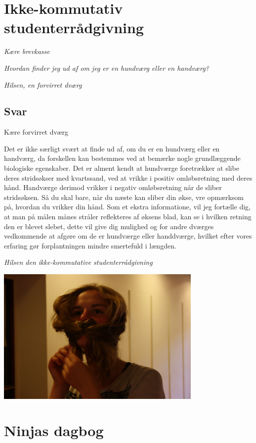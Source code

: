 \begin{minipage}[t]{100mm}
\vspace{3mm}
\section*{Ikke-kommutativ studenterrådgivning}
\emph{Kære brevkasse}

\emph{Hvordan finder jeg ud af om jeg er en hun\-dværg eller en han\-dværg?}

\emph{Hilsen, en forvirret dværg}

\subsection*{Svar}
Kære forvirret dværg

Det er ikke særligt svært at finde ud af, om du er en hundværg eller en handværg, da forskellen kan bestemmes ved at bemærke nogle grundlæggende biologiske egenskaber. Det er alment kendt at hundværge foretrækker at slibe deres stridsøkser med kvartssand, ved at vrikke i positiv omløbsretning med deres hånd. Handværge derimod vrikker i negativ omløbsretning når de sliber stridsøksen. Så du skal bare, når du næste kan sliber din økse, vre opmærksom på, hvordan du vrikker din hånd. Som et ekstra informatione, vil jeg fortælle dig, at man på målen månes stråler reflekteres af øksens blad, kan se i hvilken retning den er blevet slebet, dette vil give dig mulighed og for andre dværges vedkommende at afgøre om de er hundværge eller handdværge, hvilket efter vores erfaring gør forplantningen mindre smertefuld i længden.

{\flushright\emph{Hilsen den ikke-kommutative studenterrådgivning}}

\includegraphics[width=100mm]{kum.jpg}

\section*{Ninjas dagbog}


\end{minipage}
